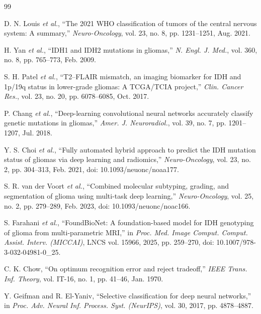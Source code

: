 \documentclass[journal]{IEEEtran}
\begin{document}
\begin{thebibliography}{99}

 D. N. Louis \emph{et al.}, ``The 2021 WHO classification of tumors of the central nervous system: A summary,'' \emph{Neuro-Oncology}, vol. 23, no. 8, pp. 1231--1251, Aug. 2021.

 H. Yan \emph{et al.}, ``IDH1 and IDH2 mutations in gliomas,'' \emph{N. Engl. J. Med.}, vol. 360, no. 8, pp. 765--773, Feb. 2009.

 S. H. Patel \emph{et al.}, ``T2--FLAIR mismatch, an imaging biomarker for IDH and 1p/19q status in lower-grade gliomas: A TCGA/TCIA project,'' \emph{Clin. Cancer Res.}, vol. 23, no. 20, pp. 6078--6085, Oct. 2017.

 P. Chang \emph{et al.}, ``Deep-learning convolutional neural networks accurately classify genetic mutations in gliomas,'' \emph{Amer. J. Neuroradiol.}, vol. 39, no. 7, pp. 1201--1207, Jul. 2018.

 Y. S. Choi \emph{et al.}, ``Fully automated hybrid approach to predict the IDH mutation status of gliomas via deep learning and radiomics,'' \emph{Neuro-Oncology}, vol. 23, no. 2, pp. 304--313, Feb. 2021, doi: 10.1093/neuonc/noaa177.

 S. R. van der Voort \emph{et al.}, ``Combined molecular subtyping, grading, and segmentation of glioma using multi-task deep learning,'' \emph{Neuro-Oncology}, vol. 25, no. 2, pp. 279--289, Feb. 2023, doi: 10.1093/neuonc/noac166.

 S. Farahani \emph{et al.}, ``FoundBioNet: A foundation-based model for IDH genotyping of glioma from multi-parametric MRI,'' in \emph{Proc. Med. Image Comput. Comput. Assist. Interv. (MICCAI)}, LNCS vol. 15966, 2025, pp. 259--270, doi: 10.1007/978-3-032-04981-0\_25.

 C. K. Chow, ``On optimum recognition error and reject tradeoff,'' \emph{IEEE Trans. Inf. Theory}, vol. IT-16, no. 1, pp. 41--46, Jan. 1970.

 Y. Geifman and R. El-Yaniv, ``Selective classification for deep neural networks,'' in \emph{Proc. Adv. Neural Inf. Process. Syst. (NeurIPS)}, vol. 30, 2017, pp. 4878--4887.


\end{thebibliography}
\end{document}
